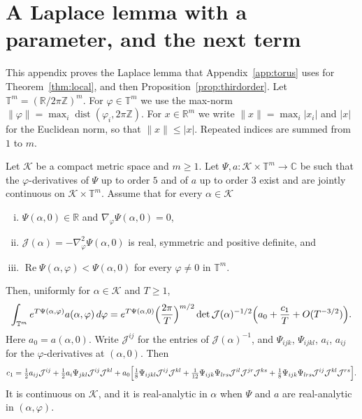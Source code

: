 \section{A Laplace lemma with a parameter, and the next term}\label{app:laplace}

This appendix proves the Laplace lemma that Appendix~\ref{app:torus} uses
for Theorem~\ref{thm:local}, and then Proposition~\ref{prop:thirdorder}. Let
$\mathbb T^m=(\mathbb R/2\pi\mathbb Z)^m$. For $\varphi\in\mathbb T^m$ we use
the max-norm $\lVert\varphi\rVert=\max_i\operatorname{dist}(\varphi_i,2\pi\mathbb Z)$.
For $x\in\mathbb R^m$ we write $\lVert x\rVert=\max_i|x_i|$ and $|x|$ for the
Euclidean norm, so that $\lVert x\rVert\le|x|$. Repeated indices are summed
from $1$ to $m$.

\begin{lemma}\label{lem:laplace}
Let $\mathcal K$ be a compact metric space and $m\ge1$. Let
$\Psi,a:\mathcal K\times\mathbb T^m\to\mathbb C$ be such that the
$\varphi$-derivatives of $\Psi$ up to order $5$ and of $a$ up to order $3$
exist and are jointly continuous on $\mathcal K\times\mathbb T^m$. Assume that
for every $\alpha\in\mathcal K$
\begin{enumerate}[(i)]
\item $\Psi(\alpha,0)\in\mathbb R$ and $\nabla_\varphi\Psi(\alpha,0)=0$,
\item $\mathcal J(\alpha)=-\nabla^2_\varphi\Psi(\alpha,0)$ is real, symmetric
and positive definite, and
\item $\operatorname{Re}\Psi(\alpha,\varphi)<\Psi(\alpha,0)$ for every
$\varphi\ne0$ in $\mathbb T^m$.
\end{enumerate}
Then, uniformly for $\alpha\in\mathcal K$ and $T\ge1$,
\[
\int_{\mathbb T^m}e^{T\Psi(\alpha,\varphi)}a(\alpha,\varphi)\,d\varphi
=e^{T\Psi(\alpha,0)}\Bigl(\frac{2\pi}T\Bigr)^{m/2}\det\mathcal J(\alpha)^{-1/2}
\Bigl(a_0+\frac{c_1}T+O(T^{-3/2})\Bigr).
\]
Here $a_0=a(\alpha,0)$. Write $\mathcal J^{ij}$ for the entries of
$\mathcal J(\alpha)^{-1}$, and $\Psi_{ijk}$, $\Psi_{ijkl}$, $a_i$, $a_{ij}$ for
the $\varphi$-derivatives at $(\alpha,0)$. Then
\[
c_1=\tfrac12a_{ij}\mathcal J^{ij}
+\tfrac12a_i\Psi_{jkl}\mathcal J^{ij}\mathcal J^{kl}
+a_0\Bigl[\tfrac18\Psi_{ijkl}\mathcal J^{ij}\mathcal J^{kl}
+\tfrac1{12}\Psi_{ijk}\Psi_{lrs}\mathcal J^{il}\mathcal J^{jr}\mathcal J^{ks}
+\tfrac18\Psi_{ijk}\Psi_{lrs}\mathcal J^{ij}\mathcal J^{kl}\mathcal J^{rs}\Bigr].
\]
It is continuous on $\mathcal K$, and it is real-analytic in $\alpha$ when
$\Psi$ and $a$ are real-analytic in $(\alpha,\varphi)$.
\end{lemma}


